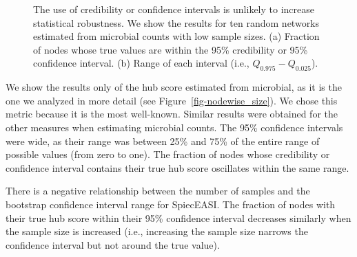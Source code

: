 \documentclass[
  a4paper,
]{article}
\begin{document}
\begin{figure}

\begin{minipage}[t]{\linewidth}

{\centering 


}

\end{minipage}%
\newline
\begin{minipage}[t]{\linewidth}

{\centering 


}

\end{minipage}%

\caption{\label{fig-intervals}The use of credibility or confidence
intervals is unlikely to increase statistical robustness. We show the
results for ten random networks estimated from microbial counts with low
sample sizes. (a) Fraction of nodes whose true values are within the
95\% credibility or 95\% confidence interval. (b) Range of each interval
(i.e., \(Q_{0.975} - Q_{0.025}\)).}

\end{figure}

We show the results only of the hub score estimated from microbial, as
it is the one we analyzed in more detail (see
Figure~\ref{fig-nodewise_size}). We chose this metric because it is the
most well-known. Similar results were obtained for the other measures
when estimating microbial counts. The 95\% confidence intervals were
wide, as their range was between 25\% and 75\% of the entire range of
possible values (from zero to one). The fraction of nodes whose
credibility or confidence interval contains their true hub score
oscillates within the same range.

There is a negative relationship between the number of samples and the
bootstrap confidence interval range for SpiecEASI. The fraction of nodes
with their true hub score within their 95\% confidence interval
decreases similarly when the sample size is increased (i.e., increasing
the sample size narrows the confidence interval but not around the true
value).
\end{document}
